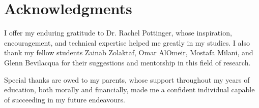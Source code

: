 
\chapter{Acknowledgments}

I offer my enduring gratitude to Dr. Rachel Pottinger, whose inspiration, encouragement, and technical expertise helped me greatly in my studies. I also thank my fellow students Zainab Zolaktaf, Omar AlOmeir, Mostafa Milani, and Glenn Bevilacqua for their suggestions and mentorship in this field of research.

Special thanks are owed to my parents, whose support throughout my years of education, both morally and financially, made me a confident individual capable of succeeding in my future endeavours.
\endinput